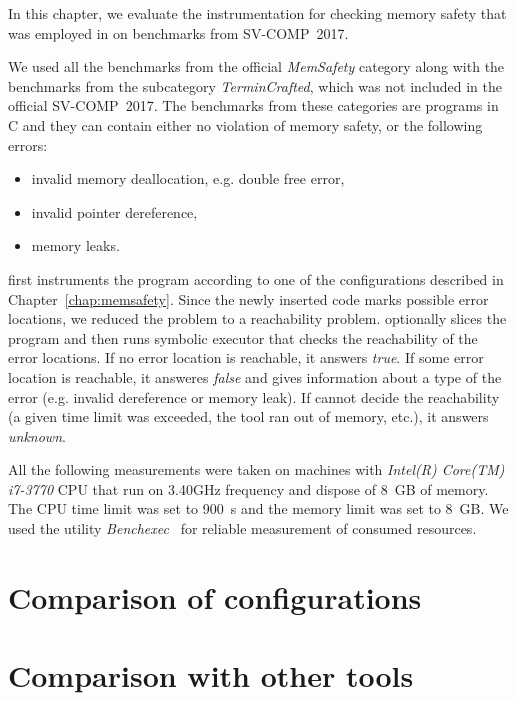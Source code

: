 In this chapter, we evaluate the instrumentation for checking memory safety
that was employed in \symbiotic on benchmarks from SV-COMP~2017.

We used all the benchmarks from the official \emph{MemSafety} category along
with the benchmarks from the subcategory \emph{TerminCrafted}, which was not
included in the official SV-COMP~2017. The benchmarks from these categories are
programs in C and they can contain either no violation of memory safety, or the
following errors:
\begin{itemize}
  \item invalid memory deallocation, e.g. double free error,
  \item invalid pointer dereference,
  \item memory leaks.
\end{itemize}

\symbiotic first instruments the program according to one of the configurations
described in Chapter~\ref{chap:memsafety}. Since the newly inserted code marks
possible error locations, we reduced the problem to a reachability problem.
\symbiotic optionally slices the program and then runs symbolic executor \klee
that checks the reachability of the error locations. If no error location is
reachable, it answers \emph{true}. If some error location is reachable, it
answeres \emph{false} and gives information about a type of the error (e.g.
invalid dereference or memory leak). If \symbiotic cannot decide the
reachability (a given time limit was exceeded, the tool ran out of memory,
etc.), it answers \emph{unknown}.

All the following measurements were taken on machines with \textit{Intel(R)
Core(TM) i7-3770} CPU that run on 3.40GHz frequency and dispose of 8~GB of
memory. The CPU time limit was set to 900~s and the memory limit was set to
8~GB. We used the utility \emph{Benchexec}~\cite{Beyer2015} for reliable
measurement of consumed resources.

\section{Comparison of configurations}



\section{Comparison with other tools}
